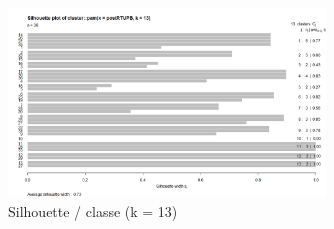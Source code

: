 \begin{figure}[H]
\centering
\includegraphics[width=0.75\textwidth]{../Fig/RTUPB/rtupb-sil-k13-post.png}
\caption{Silhouette / classe (k = 13)}
\end{figure}




%
